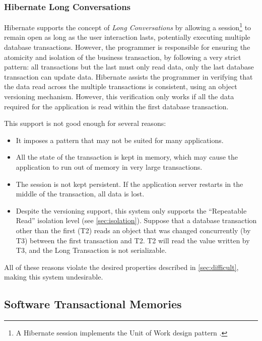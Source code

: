\documentclass{llncs}
\begin{document}
\subsubsection{Hibernate Long Conversations}

Hibernate supports the concept of {\it Long Conversations} by allowing
a session\footnote{A Hibernate session implements the Unit of Work
  design pattern \cite{fowler2003patterns}.} to remain open as long as
the user interaction lasts, potentially executing multiple database
transactions. However, the programmer is responsible for ensuring the
atomicity and isolation of the business transaction, by following a
very strict pattern: all transactions but the last must only read
data, only the last database transaction can update data. Hibernate
assists the programmer in verifying that the data read across the
multiple transactions is consistent, using an object versioning
mechanism. However, this verification only works if all the data
required for the application is read within the first database
transaction.

This support is not good enough for several reasons:

\begin{itemize}
\item It imposes a pattern that may not be suited for many
  applications.
\item All the state of the transaction is kept in memory, which may
  cause the application to run out of memory in very large
  transactions.
\item The session is not kept persistent. If the application server
  restarts in the middle of the transaction, all data is lost.
\item Despite the versioning support, this system only supports the
  ``Repeatable Read'' isolation level (see
  \ref{sec:isolation}). Suppose that a database transaction other than
  the first (T2) reads an object that was changed concurrently (by T3)
  between the first transaction and T2. T2 will read the value written
  by T3, and the Long Transaction is not serializable.
\end{itemize}

All of these reasons violate the desired properties described in
\ref{sec:difficult}, making this system undesirable.

\subsection{Software Transactional Memories}
\label{sec:stm}
\end{document}
